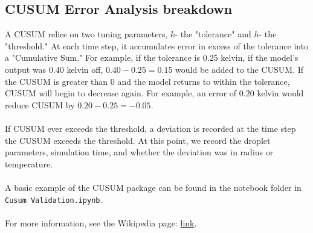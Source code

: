 \documentclass{article}
\begin{document}
\subsection{CUSUM Error Analysis breakdown}
A CUSUM relies on two tuning parameters, $k$- the "tolerance" and $h$- the "threshold." At each time step, it accumulates error in excess of the tolerance into a "Cumulative Sum." For example, if the tolerance is $0.25$ kelvin, if the model's output was $0.40$ kelvin off, $0.40 - 0.25 = 0.15$ would be added to the CUSUM. If the CUSUM is greater than 0 and the model returns to within the tolerance, CUSUM will begin to decrease again. For example, an error of $0.20$ kelvin would reduce CUSUM by $0.20 - 0.25 = -0.05$.\\\\
If CUSUM ever exceeds the threshold, a deviation is recorded at the time step the CUSUM exceeds the threshold. At this point, we record the droplet parameters, simulation time, and whether the deviation was in radius or temperature.\\\\
A basic example of the CUSUM package can be found in the notebook folder in\\
\lstinline{Cusum Validation.ipynb}.\\\\
For more information, see the Wikipedia page: \href{https://en.wikipedia.org/wiki/CUSUM}{link}.
\end{document}
